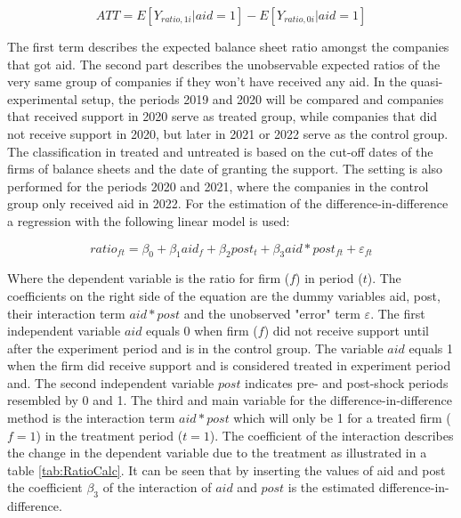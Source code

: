 \begin{equation}
    ATT = E[Y_{ratio,1i}| aid=1]-E[Y_{ratio,0i}| aid=1] 
    \label{eqn:ATT}
\end{equation}

The first term describes the expected balance sheet ratio amongst the companies that got aid. The second part describes the unobservable expected ratios of the very same group of companies if they won’t have received any aid. In the quasi-experimental setup, the periods 2019 and 2020 will be compared and companies that received support in 2020 serve as treated group, while companies that did not receive support in 2020, but later in 2021 or 2022 serve as the control group. The classification in treated and untreated is based on the cut-off dates of the firms of balance sheets and the date of granting the support. The setting is also performed for the periods 2020 and 2021, where the companies in the control group only received aid in 2022. For the estimation of the difference-in-difference a regression with the following linear model is used:


\begin{equation}
    ratio_{ft} = \beta_{0} + \beta_{1}aid_{f} + \beta_{2}post_{t} + \beta_{3}aid\ast post_{ft} + \varepsilon_{ft} 
    \label{eqn:Diff&Diff}
\end{equation}

Where the dependent variable is the ratio for firm ($f$) in period ($t$). The coefficients on the right side of the equation are the dummy variables aid, post, their interaction term $ aid\ast post$ and the unobserved "error" term $ \varepsilon$. The first independent variable $aid$ equals 0 when firm ($f$) did not receive support until after the experiment period and is in the control group. The variable $aid$ equals 1 when the firm did receive support and is considered treated in experiment period and. The second independent variable $post$ indicates pre- and post-shock periods resembled by 0 and 1. The third and main variable for the difference-in-difference method is the interaction term $ aid\ast post$ which will only be 1 for a treated firm ($f=1$) in the treatment period ($t=1$). The coefficient of the interaction describes the change in the dependent variable due to the treatment as illustrated in a table \ref{tab:RatioCalc}. It can be seen that by inserting the values of aid and post the coefficient $\beta_{3}$ of the interaction of $aid$ and $post$ is the estimated difference-in-difference.

